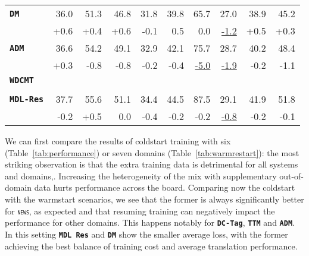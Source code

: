 \documentclass[11pt,a4paper]{article}
\newcommand{\fyTodo}[1]{\Todo[FY:]{\textcolor{orange}{#1}}}
\newcommand{\fyDone}[1]{\done[FY]\Todo[FY:]{\textcolor{orange}{#1}}}
\newcommand{\domain}[1]{\texttt{\textsc{#1}}}
\newcommand{\system}[1]{\texttt{\textbf{#1}}}
\newcommand{\SW}[1]{\underline{#1}}
\begin{document}
\begin{table*}
\begin{tabular}{|p{2.5cm}|*{9}{r|}}
    \system{DM}            &36.0 &51.3&46.8&31.8&39.8&65.7&27.0 & 38.9 & 45.2\\[-2pt]
                   &+0.6&+0.4&+0.6&-0.1&0.5&0.0&\SW{-1.2}& +0.5 & +0.3\\    
    
    \system{ADM}          &36.6&54.2&49.1&32.9&42.1&75.7&28.7 & 40.2 & 48.4 \\[-2pt]
                   & +0.3 & -0.8 & -0.8 & -0.2 & -0.4 & \SW{-5.0} & \SW{-1.9} & -0.2 & -1.1\\
    
    \system{WDCMT}     &&&&&&& & &\\[-2pt]
                    &&&&&&&&& \\

    \system{MDL-Res}    &37.7   & 55.6   & 51.1   & 34.4  & 44.5  & 87.5  & 29.1 & 41.9 & 51.8 \\[-2pt]
                        & -0.2 & +0.5 & 0.0 & -0.4  &  -0.2 & -0.2 & \SW{-0.8} & -0.2 & -0.1 \\
     \hline
  \end{tabular}
  \caption{Ability to handle new a domain: BLEU scores for the ``resume training'' mode compared to a complete training session. Averages only take into account the six initial domains (\domain{News} excluded). Underline denotes a significant loss between warmstart and coldstart, bold for a significant gain.}
  \label{tab:warmrestart}
  \fyTodo{Fill the table, significancy testing against initial learning condition, for each domain, and averages ? }
  \fyTodo{Need correct number / differences for Mixed-Nat}
  \fyDone{averages include one more domain ? No for comparison}
\end{table*}

We can first compare the results of coldstart training with six (Table~\ref{tab:performance}) or seven domains (Table~\ref{tab:warmrestart}): the most striking observation is that the extra training data is detrimental for all systems and domains,\fyTodo{is this significant ?}. Increasing the heterogeneity of the mix with supplementary out-of-domain data hurts performance across the board.
Comparing now the coldstart with the warmstart scenarios, we see that the former is always significantly better for \domain{news}, as expected and that resuming training can negatively impact the performance for other domains. This happens notably for \system{DC-Tag}, \system{TTM} and \system{ADM}. In this setting \system{MDL Res} and \system{DM} show the smaller average loss, with the former achieving the best balance of training cost and average translation performance.%
\end{document}
